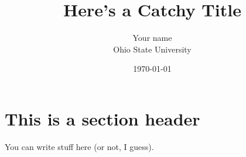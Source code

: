 \documentclass[12pt]{article}
\title{Here's a Catchy Title}
\author{ Your name \\
Ohio State University\\
}
\date{\today}
\begin{document}
\maketitle
\section{This is a section header}

You can write stuff here (or not, I guess).

\newpage

\end{document}
